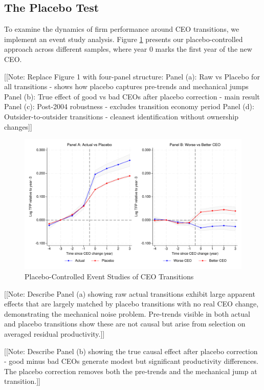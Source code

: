 \documentclass[11pt,a4paper]{article}
\begin{document}
\subsection{The Placebo Test}

To examine the dynamics of firm performance around CEO transitions, we implement an event study analysis. Figure \ref{fig:event_study_main} presents our placebo-controlled approach across different samples, where year 0 marks the first year of the new CEO.

[[Note: Replace Figure 1 with four-panel structure:
Panel (a): Raw vs Placebo for all transitions - shows how placebo captures pre-trends and mechanical jumps
Panel (b): True effect of good vs bad CEOs after placebo correction - main result
Panel (c): Post-2004 robustness - excludes transition economy period
Panel (d): Outsider-to-outsider transitions - cleanest identification without ownership changes]]

\begin{figure}[htbp]
\centering
\includegraphics[width=\textwidth]{figure/event_study.pdf}
\caption{Placebo-Controlled Event Studies of CEO Transitions}
\label{fig:event_study_main}
\end{figure}

[[Note: Describe Panel (a) showing raw actual transitions exhibit large apparent effects that are largely matched by placebo transitions with no real CEO change, demonstrating the mechanical noise problem. Pre-trends visible in both actual and placebo transitions show these are not causal but arise from selection on averaged residual productivity.]]

[[Note: Describe Panel (b) showing the true causal effect after placebo correction - good minus bad CEOs generate modest but significant productivity differences. The placebo correction removes both the pre-trends and the mechanical jump at transition.]]
\end{document}
